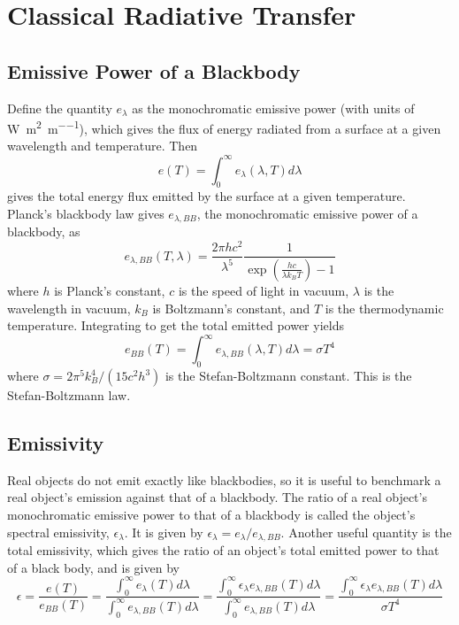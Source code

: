 \chapter[Classical Radiative Transfer][Classical Radiative Transfer]{Classical Radiative Transfer} \label{ap:CRT} \allowdisplaybreaks

\section{Emissive Power of a Blackbody}
%
Define the quantity $e_{\lambda}$ as the monochromatic emissive power (with units of \si{\watt\per\square\meter\per\meter}), which gives the flux of energy radiated from a surface at a given wavelength and temperature. Then 
%
\begin{equation}
e(T) = \int_{0}^{\infty} e_{\lambda}(\lambda, T) d\lambda
\end{equation}
%
gives the total energy flux emitted by the surface at a given temperature. Planck's blackbody law gives $e_{\lambda, BB}$, the monochromatic emissive power of a blackbody, as
%
\begin{equation}\label{eq:BlackBody_Power}
    e_{\lambda, BB}(T,\lambda) = \frac{2 \pi h c^{2}}{\lambda^{5}} \frac{1}{\exp{\left( \frac{hc}{\lambda k_{B}T} \right)} -1}
\end{equation}
%
where $h$ is Planck's constant, $c$ is the speed of light in vacuum, $\lambda$ is the wavelength in vacuum, $k_{B}$ is Boltzmann's constant, and $T$ is the thermodynamic temperature. Integrating to get the total emitted power yields
\begin{equation} \label{eq:StefanBoltzmannLaw}
e_{BB}(T) = \int_{0}^{\infty} e_{\lambda, BB}(\lambda, T) d\lambda = \sigma T^{4}
\end{equation}
%
where $\sigma = 2 \pi^{5} k_{B}^{4}/( 15 c^{2} h^{3} )$ is the Stefan-Boltzmann constant. This is the Stefan-Boltzmann law.

\section{Emissivity}
%
Real objects do not emit exactly like blackbodies, so it is useful to benchmark a real object's emission against that of a blackbody. The ratio of a real object's monochromatic emissive power to that of a blackbody is called the object's spectral emissivity, $\epsilon_{\lambda}$. It is given by $\epsilon_{\lambda} = e_{\lambda} / e_{\lambda, BB}$. Another useful quantity is the total emissivity, which gives the ratio of an object's total emitted power to that of a black body, and is given by
%
\begin{equation}
\epsilon = \frac{e(T)}{e_{BB}(T)} = \frac{ \int_{0}^{\infty} e_{\lambda}(T) d\lambda }{ \int_{0}^{\infty} e_{\lambda,BB}(T) d\lambda } = \frac{ \int_{0}^{\infty} \epsilon_{\lambda} e_{\lambda,BB}(T) d\lambda }{ \int_{0}^{\infty} e_{\lambda,BB}(T) d\lambda } = \frac{ \int_{0}^{\infty} \epsilon_{\lambda} e_{\lambda,BB}(T) d\lambda }{\sigma T^{4}}
\end{equation}


